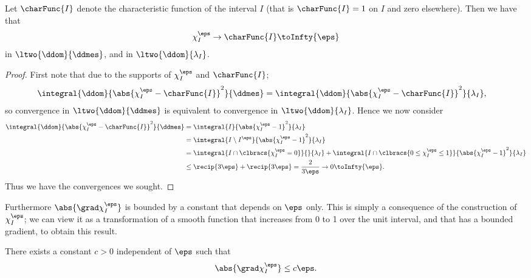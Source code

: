 \begin{lemma} \label{lem:ChiConv}
	Let $\charFunc{I}$ denote the characteristic function of the interval $I$ (that is $\charFunc{I}=1$ on $I$ and zero elsewhere).
	Then we have that 
	\begin{align*}
		\chi_I^\eps \rightarrow \charFunc{I} \toInfty{\eps}
	\end{align*}
	in $\ltwo{\ddom}{\ddmes}$, and in $\ltwo{\ddom}{\lambda_I}$.
\end{lemma}
\begin{proof}
	First note that due to the supports of $\chi_I^\eps$ and $\charFunc{I}$;
	\begin{align*}
		\integral{\ddom}{\abs{ \chi_I^\eps - \charFunc{I} }^2}{\ddmes}
		&= \integral{\ddom}{\abs{ \chi_I^\eps - \charFunc{I} }^2}{\lambda_I},
	\end{align*}
	so convergence in $\ltwo{\ddom}{\ddmes}$ is equivalent to convergence in $\ltwo{\ddom}{\lambda_I}$.
	Hence we now consider
	\begin{align*}
		\integral{\ddom}{\abs{ \chi_I^\eps - \charFunc{I} }^2}{\ddmes}
		&= \integral{I}{\abs{ \chi_I^\eps - 1 }^2}{\lambda_I} \\
		&= \integral{I\setminus I^\eps}{\abs{ \chi_I^\eps - 1 }^2}{\lambda_I} \\
		&= \integral{I\cap\clbracs{\chi_I^\eps = 0}}{}{\lambda_I}
		+ \integral{I\cap\clbracs{0\leq\chi_I^\eps \leq 1}}{\abs{ \chi_I^\eps - 1 }^2}{\lambda_I} \\
		&\leq \recip{3\eps} + \recip{3\eps} = \frac{2}{3\eps} \rightarrow 0 \toInfty{\eps}.
	\end{align*}
	Thus we have the convergences we sought.
\end{proof}

Furthermore $\abs{\grad\chi_I^\eps}$ is bounded by a constant that depends on $\eps$ only.
This is simply a consequence of the construction of $\chi_I^\eps$; we can view it as a transformation of a smooth function that increases from 0 to 1 over the unit interval, and that has a bounded gradient, to obtain this result.
\begin{lemma} \label{lem:BoundChiGradient}
	There exists a constant $c>0$ independent of $\eps$ such that
	\begin{align*}
		\abs{\grad\chi_I^\eps} \leq c\eps.
	\end{align*}
\end{lemma}

